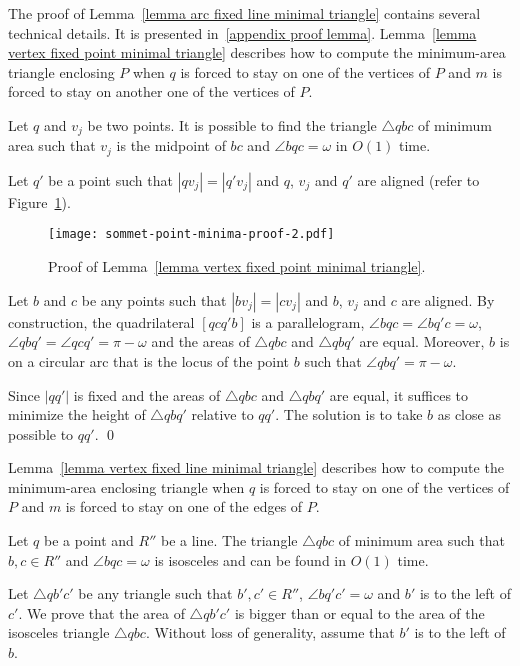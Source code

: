 \documentclass[11pt, oneside]{article}
\begin{document}
The proof of Lemma~\ref{lemma arc fixed line minimal triangle}
contains several technical details.
It is presented in~\ref{appendix proof lemma}.
Lemma~\ref{lemma vertex fixed point minimal triangle}
describes how to compute the minimum-area triangle enclosing $P$
when $q$ is forced to stay on one of the vertices of $P$
and $m$ is forced to stay on another one of the vertices of $P$.
\begin{lemma}
\label{lemma vertex fixed point minimal triangle}
Let $q$ and $v_j$ be two points.
It is possible to find the triangle $\triangle qbc$
of minimum area such that 
$v_j$ is the midpoint of $bc$
and $\angle bqc = \omega$
in $O(1)$ time.
\end{lemma}

\proof Let $q'$ be a point such that $|qv_j| = |q'v_j|$
and $q$, $v_j$ and $q'$ are aligned
(refer to Figure~\ref{sommet-point-minima-proof-2}).
\begin{figure}
\centering
\texttt{[image: sommet-point-minima-proof-2.pdf]}
\caption{Proof of Lemma~\ref{lemma vertex fixed point minimal triangle}.\label{sommet-point-minima-proof-2}}
\end{figure}
Let $b$ and $c$ be any points such that 
$|bv_j| = |cv_j|$ and $b$, $v_j$ and $c$ are aligned.
By construction,
the quadrilateral $[qcq'b]$ is a parallelogram,
$\angle bqc = \angle bq'c = \omega$,
$\angle qbq' = \angle qcq' = \pi-\omega$
and the areas of $\triangle qbc$ and $\triangle qbq'$ are equal.
Moreover,
$b$ is on a circular arc
that is the locus of the point $b$
such that $\angle qbq' = \pi-\omega$.

Since $|qq'|$ is fixed and the areas of $\triangle qbc$ and $\triangle qbq'$ are equal,
it suffices to minimize the height of $\triangle qbq'$ relative to $qq'$.
The solution is to take $b$ as close as possible to $qq'$.
\qed

Lemma~\ref{lemma vertex fixed line minimal triangle}
describes how to compute the minimum-area enclosing triangle
when $q$ is forced to stay on one of the vertices of $P$
and $m$ is forced to stay on one of the edges of $P$.
\begin{lemma}
\label{lemma vertex fixed line minimal triangle}
Let $q$ be a point
and $R''$ be a line.
The triangle $\triangle qbc$
of minimum area such that 
$b,c\in R''$
and $\angle bqc = \omega$
is isosceles
and can be found
in $O(1)$ time.
\end{lemma}


\proof
Let $\triangle qb'c'$ be any triangle such that $b',c'\in R''$,
$\angle bq'c' = \omega$
and $b'$ is to the left of $c'$.
We prove that the area of $\triangle qb'c'$ is bigger than or equal to the area of the isosceles triangle $\triangle qbc$.
Without loss of generality,
assume that $b'$ is to the left of $b$.
\end{document}
